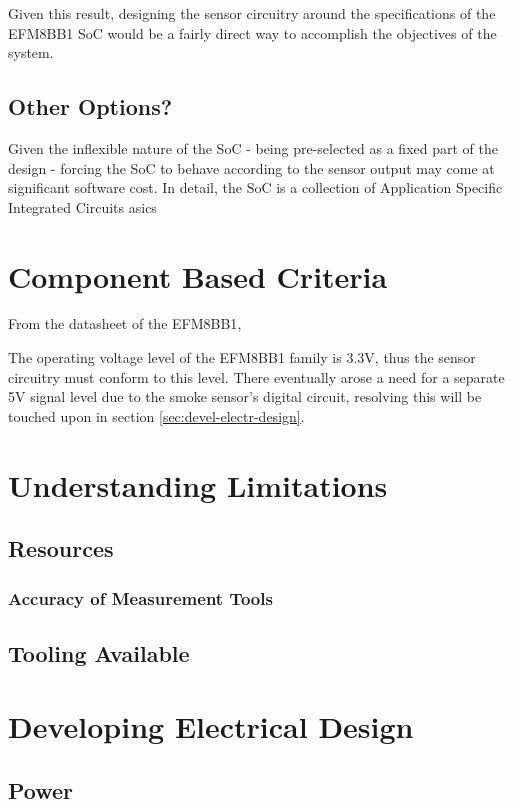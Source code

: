 \documentclass[12pt]{article}
\begin{document}
  Given this result, designing the sensor circuitry around the specifications of the EFM8BB1 SoC would be a fairly direct way to accomplish the objectives of the system.

  \subsection{Other Options?}
  Given the inflexible nature of the SoC - being pre-selected as a fixed part of the design - forcing the SoC to behave according to the sensor output may come at significant software cost. In detail, the SoC is a collection of Application Specific Integrated Circuits \acp{asic}

  \section{Component Based Criteria}

  From the datasheet of the EFM8BB1\cite{silabs:efm8bb1},

  The operating voltage level of the EFM8BB1 family is 3.3V, thus the sensor circuitry must conform to this level. There eventually arose a need for a separate 5V signal level due to the smoke sensor's digital circuit, resolving this will be touched upon in section \ref{sec:devel-electr-design}.

	\section{Understanding Limitations}
	\subsection{Resources}
  \subsubsection{Accuracy of Measurement Tools}
	\subsection{Tooling Available}
	
	
	
	\section{Developing Electrical Design\label{sec:devel-electr-design}} 
	\subsection{Power}
  
\end{document}
